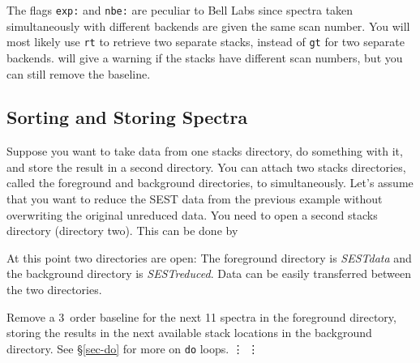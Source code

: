 The flags {\tt exp:} and {\tt nbe:} are peculiar to Bell Labs since 
spectra taken simultaneously with different backends are given the same
scan number. You will most likely use {\tt rt} to retrieve two separate stacks,
instead of {\tt gt} for two separate backends. 
\COMB will give a warning if the stacks have different
scan numbers, but you can still remove the baseline.

\subsection{Sorting and Storing Spectra}
\label{sec-amp}

Suppose you want to take data from one stacks directory, do something 
with it, and store the result in a second directory.  You can attach 
two stacks directories, called the foreground and background directories, 
to \COMB simultaneously.  
Let's assume that you want to reduce the SEST data from the previous
example without overwriting the original unreduced data.  You need to 
open a second stacks directory (directory two).  This can be done by


\noindent At this point two directories are open:  The foreground directory
is {\sl SESTdata\/} and the background directory is {\sl SESTreduced\/}.  Data
can be easily transferred between the two directories.  

		  {Remove a 3\urd\ order baseline for the next 11 spectra
		  in the foreground directory, storing the results in
		  the next available stack locations in the background
		  directory. See \S \ref{sec-do} for more on {\tt do} loops.}
\vdots
{}
\vdots
{}

